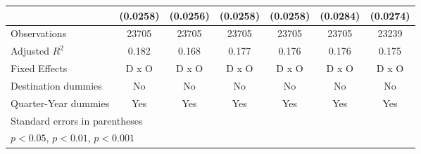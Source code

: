 \begin{table}[htbp]
\begin{tabular}{l*{6}{c}}
                    &    (0.0258)         &    (0.0256)         &    (0.0258)         &    (0.0258)         &    (0.0284)         &    (0.0274)         \\
\hline
Observations        &       23705         &       23705         &       23705         &       23705         &       23705         &       23239         \\
Adjusted \(R^{2}\)  &       0.182         &       0.168         &       0.177         &       0.176         &       0.176         &       0.175         \\
Fixed Effects       &       D x O         &       D x O         &       D x O         &       D x O         &       D x O         &       D x O         \\
Destination dummies &          No         &          No         &          No         &          No         &          No         &          No         \\
Quarter-Year dummies&         Yes         &         Yes         &         Yes         &         Yes         &         Yes         &         Yes         \\
\hline\hline
\multicolumn{7}{l}{\footnotesize Standard errors in parentheses}\\
\multicolumn{7}{l}{\footnotesize \sym{*} \(p<0.05\), \sym{**} \(p<0.01\), \sym{***} \(p<0.001\)}\\
\end{tabular}
\end{table}
